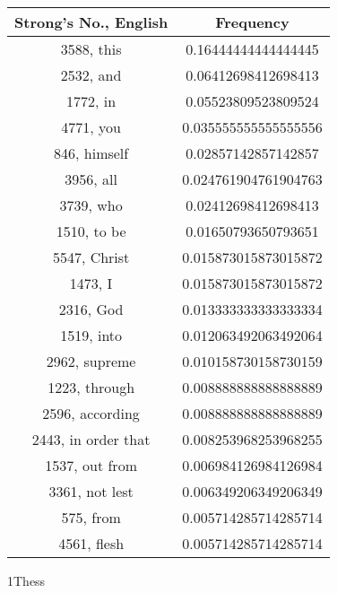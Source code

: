 \documentclass[12pt,letterpaper]{article}
\begin{document}
 \begin{longtable}{|c|c|}
\hline
 Strong's No., English & Frequency \\ \hline  
3588, this & 0.16444444444444445\\ \hline 
 2532, and & 0.06412698412698413\\ \hline 
 1772, in & 0.05523809523809524\\ \hline 
 4771, you & 0.035555555555555556\\ \hline 
 846, himself & 0.02857142857142857\\ \hline 
 3956, all & 0.024761904761904763\\ \hline 
 3739, who & 0.02412698412698413\\ \hline 
 1510, to be & 0.01650793650793651\\ \hline 
 5547, Christ & 0.015873015873015872\\ \hline 
 1473, I & 0.015873015873015872\\ \hline 
 2316, God & 0.013333333333333334\\ \hline 
 1519, into & 0.012063492063492064\\ \hline 
 2962, supreme & 0.010158730158730159\\ \hline 
 1223, through & 0.008888888888888889\\ \hline 
 2596, according & 0.008888888888888889\\ \hline 
 2443, in order that & 0.008253968253968255\\ \hline 
 1537, out from & 0.006984126984126984\\ \hline 
 3361, not lest & 0.006349206349206349\\ \hline 
 575, from & 0.005714285714285714\\ \hline 
 4561, flesh & 0.005714285714285714\\ \hline 
\end{longtable} 
 

1Thess
\end{document}
